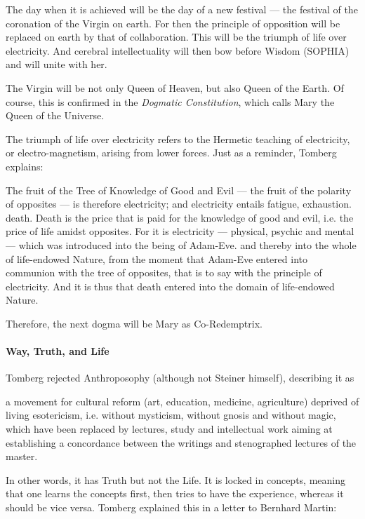 \begin{quotationx}
The day when it is achieved will be the day of a new festival — the festival of the coronation of the Virgin
on earth. For then the principle of opposition will be replaced on earth by that of collaboration. This will be the
triumph of life over electricity. And cerebral intellectuality will then bow before Wisdom (SOPHIA) and will unite with
her. 

\end{quotationx}
The Virgin will be not only Queen of Heaven, but also Queen of the Earth. Of course, this is confirmed in the
\emph{Dogmatic Constitution}, which calls Mary the Queen of the Universe.

The triumph of life over electricity refers to the Hermetic teaching of electricity, or electro-magnetism, arising from
lower forces. Just as a reminder, Tomberg explains:

\begin{quotationx}
The fruit of the Tree of Knowledge of Good and Evil — the fruit of the polarity of opposites — is therefore electricity; and electricity entails fatigue, exhaustion. death. Death is the price that is paid for the
knowledge of good and evil, i.e. the price of life amidst opposites. For it is electricity — physical,
psychic and mental — which was introduced into the being of Adam-Eve. and thereby into the whole of
life-endowed Nature, from the moment that Adam-Eve entered into communion with the tree of opposites, that is to say
with the principle of electricity. And it is thus that death entered into the domain of life-endowed Nature. 

\end{quotationx}
Therefore, the next dogma will be Mary as Co-Redemptrix.

\paragraph{Way, Truth, and Life}
Tomberg rejected Anthroposophy (although not Steiner himself), describing it as

\begin{quotationx}
a movement for cultural reform (art, education, medicine, agriculture) deprived of living esotericism, i.e. without
mysticism, without gnosis and without magic, which have been replaced by lectures, study and intellectual work aiming
at establishing a concordance between the writings and stenographed lectures of the master. 

\end{quotationx}
In other words, it has Truth but not the Life. It is locked in concepts, meaning that one learns the concepts first,
then tries to have the experience, whereas it should be vice versa. Tomberg explained this in a letter to Bernhard
Martin:

